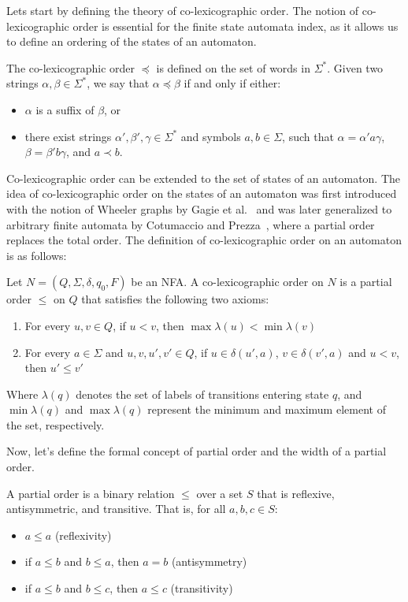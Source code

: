 Lets start by defining the theory of co-lexicographic order. The notion of co-lexicographic order is essential for the finite state automata index, as it allows us to define an ordering of the states of an automaton. 
\begin{definition} 
    The co-lexicographic order $\preceq$ is defined on the set of words in $\Sigma^*$. Given two strings $\alpha, \beta \in \Sigma^*$, we say that $\alpha \preceq \beta$ if and only if either:
    \begin{itemize}
        \item $\alpha$ is a suffix of $\beta$, or
        \item there exist strings $\alpha', \beta', \gamma \in \Sigma^*$ and symbols $a, b \in \Sigma$, such that $\alpha = \alpha'a\gamma$, $\beta = \beta'b\gamma$, and $a \prec b$.
    \end{itemize}
\end{definition}
Co-lexicographic order can be extended to the set of states of an automaton. The idea of co-lexicographic order on the states of an automaton was first introduced with the notion of Wheeler graphs by Gagie et al.~\cite{gagie2017wheeler} and was later generalized to arbitrary finite automata by Cotumaccio and Prezza~\cite{cotumaccio2021indexing}, where a partial order replaces the total order. The definition of co-lexicographic order on an automaton is as follows:

\begin{definition} \label{def:colex_order_on_automaton}
    Let $N = (Q, \Sigma, \delta, q_0, F)$ be an NFA. A co-lexicographic order on $N$ is a partial order $\leq$ on $Q$ that satisfies the following two axioms:
    \begin{enumerate}
        \item For every $u, v \in Q$, if $u < v$, then $\max\lambda(u) < \min\lambda(v)$
        \item For every $a \in \Sigma$ and $u, v, u', v' \in Q$, if $u \in \delta(u', a)$, $v \in \delta(v', a)$ and $u < v$, then $u' \leq v'$
    \end{enumerate}
\end{definition}
Where $\lambda(q)$ denotes the set of labels of transitions entering state $q$, and $\min\lambda(q)$ and $\max\lambda(q)$ represent the minimum and maximum element of the set, respectively.

Now, let's define the formal concept of partial order and the width of a partial order. 
\begin{definition}
    A partial order is a binary relation $\leq$ over a set $S$ that is reflexive, antisymmetric, and transitive. That is, for all $a, b, c \in S$:
    \begin{itemize}
        \item $a \leq a$ (reflexivity)
        \item if $a \leq b$ and $b \leq a$, then $a = b$ (antisymmetry)
        \item if $a \leq b$ and $b \leq c$, then $a \leq c$ (transitivity)
    \end{itemize}
\end{definition}

